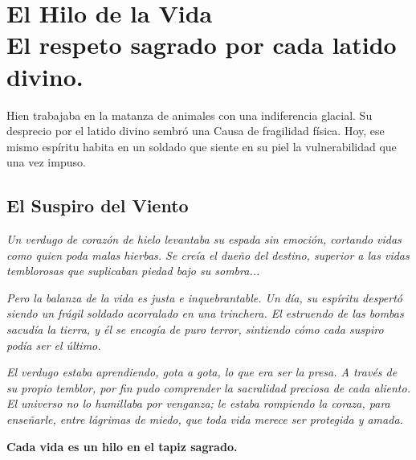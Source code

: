 \chapter[El Hilo de la Vida]{El Hilo de la Vida\\ \large El respeto sagrado por cada latido divino.}


\lettrine[lines=3, nindent=0.5em, findent=0.2em]{H}{}ien trabajaba en la matanza de animales con una indiferencia glacial. Su desprecio por el latido divino sembró una Causa de fragilidad física. Hoy, ese mismo espíritu habita en un soldado que siente en su piel la vulnerabilidad que una vez impuso.

\section{El Suspiro del Viento}
\begin{elegantquote}
\textit{Un verdugo de corazón de hielo levantaba su espada sin emoción, cortando vidas como quien poda malas hierbas. Se creía el dueño del destino, superior a las vidas temblorosas que suplicaban piedad bajo su sombra...}

\textit{Pero la balanza de la vida es justa e inquebrantable. Un día, su espíritu despertó siendo un frágil soldado acorralado en una trinchera. El estruendo de las bombas sacudía la tierra, y él se encogía de puro terror, sintiendo cómo cada suspiro podía ser el último.}

\textit{El verdugo estaba aprendiendo, gota a gota, lo que era ser la presa. A través de su propio temblor, por fin pudo comprender la sacralidad preciosa de cada aliento. El universo no lo humillaba por venganza; le estaba rompiendo la coraza, para enseñarle, entre lágrimas de miedo, que toda vida merece ser protegida y amada.}

\end{elegantquote}

\vspace{1em}
\begin{center}
    \textbf{\Large Cada vida es un hilo en el tapiz sagrado.}
\end{center}
\vspace{1em}

